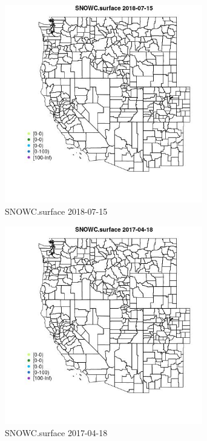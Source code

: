 \begin{figure} 
\centering  
\includegraphics[width=0.77\textwidth]{Code_Outputs/Report_ML_input_PM25_Step4_part_e_de_duplicated_aveswNAs_MapObsSNOWCsurface2018-07-15.jpg} 
\caption{\label{fig:Report_ML_input_PM25_Step4_part_e_de_duplicated_aveswNAsMapObsSNOWCsurface2018-07-15}SNOWC.surface 2018-07-15} 
\end{figure} 
 

\clearpage 

\begin{figure} 
\centering  
\includegraphics[width=0.77\textwidth]{Code_Outputs/Report_ML_input_PM25_Step4_part_e_de_duplicated_aveswNAs_MapObsSNOWCsurface2017-04-18.jpg} 
\caption{\label{fig:Report_ML_input_PM25_Step4_part_e_de_duplicated_aveswNAsMapObsSNOWCsurface2017-04-18}SNOWC.surface 2017-04-18} 
\end{figure} 
 

